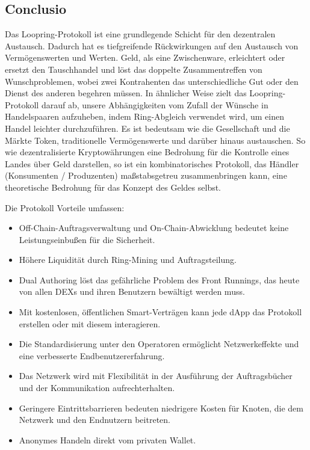 \documentclass[UTF8,nofonts]{article}
\begin{document}
\begin{multicols}{2}
\section{Conclusio}


Das Loopring-Protokoll ist eine grundlegende Schicht für den dezentralen Austausch. Dadurch hat es tiefgreifende Rückwirkungen auf den Austausch von Vermögenswerten und Werten. Geld, als eine Zwischenware, erleichtert oder ersetzt den Tauschhandel und löst das doppelte Zusammentreffen von Wunschproblemen\cite{unenumerated2006}, wobei zwei Kontrahenten das unterschiedliche Gut oder den Dienst des anderen begehren müssen. In ähnlicher Weise zielt das Loopring-Protokoll darauf ab, unsere Abhängigkeiten vom Zufall der Wünsche in Handelspaaren aufzuheben, indem Ring-Abgleich verwendet wird, um einen Handel leichter durchzuführen. Es ist bedeutsam wie die Gesellschaft und die Märkte Token, traditionelle Vermögenswerte und darüber hinaus austauschen. So wie dezentralisierte Kryptowährungen eine Bedrohung für die Kontrolle eines Landes über Geld darstellen, so ist ein kombinatorisches Protokoll, das Händler (Konsumenten / Produzenten) maßstabsgetreu zusammenbringen kann, eine theoretische Bedrohung für das Konzept des Geldes selbst.

Die Protokoll Vorteile umfassen:

\begin{itemize}
	\item Off-Chain-Auftragsverwaltung und On-Chain-Abwicklung bedeutet keine Leistungseinbußen für die Sicherheit.
	\item Höhere Liquidität durch Ring-Mining und Auftragsteilung.
	\item Dual Authoring löst das gefährliche Problem des Front Runnings, das heute von allen DEXs und ihren Benutzern bewältigt werden muss.
	\item Mit kostenlosen, öffentlichen Smart-Verträgen kann jede dApp das Protokoll erstellen oder mit diesem interagieren.
	\item Die Standardisierung unter den Operatoren ermöglicht Netzwerkeffekte und eine verbesserte Endbenutzererfahrung.
	\item Das Netzwerk wird mit Flexibilität in der Ausführung der Auftragsbücher und der Kommunikation aufrechterhalten.
	\item Geringere Eintrittsbarrieren bedeuten niedrigere Kosten für Knoten, die dem Netzwerk und den Endnutzern beitreten.
	\item Anonymes Handeln direkt vom privaten Wallet.
\end{itemize}


\end{multicols}
\end{document}
